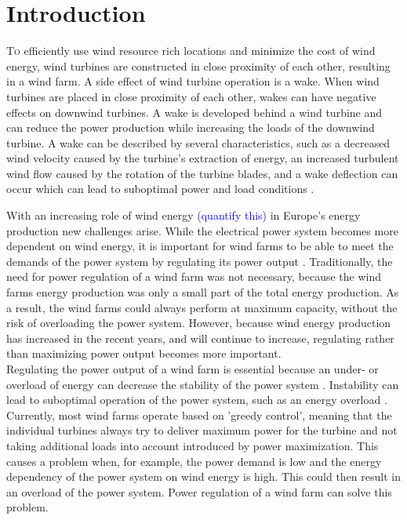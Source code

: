 \section{Introduction}
\lettrine[nindent=0em,lines=3]To efficiently use wind resource rich locations and minimize the cost of wind energy, wind turbines are constructed in close proximity of each other, resulting in a wind farm. A side effect of wind turbine operation is a wake. When wind turbines are placed in close proximity of each other, wakes can have negative effects on downwind turbines. A wake is developed behind a wind turbine and can reduce the power production while increasing the loads of the downwind turbine. A wake can be described by several characteristics, such as a decreased wind velocity caused by the turbine's extraction of energy, an increased turbulent wind flow caused by the rotation of the turbine blades, and a wake deflection can occur which can lead to suboptimal power and load conditions \cite{Boersma2017, Wilson2017, Dijk2016, Fleming2014, Zalkind2016}.

With an increasing role of wind energy \textcolor{blue}{(quantify this)} in Europe's energy production new challenges arise\cite{Nat2016}. While the electrical power system becomes more dependent on wind energy, it is important for wind farms to be able to meet the demands of the power system by regulating its power output \cite{Tande2003}. Traditionally, the need for power regulation of a wind farm was not necessary, because the wind farms energy production was only a small part of the total energy production. As a result, the wind farms could always perform at maximum capacity, without the risk of overloading the power system. However, because wind energy production has increased in the recent years, and will continue to increase, regulating rather than maximizing power output becomes more important.\\ 
\indent Regulating the power output of a wind farm is essential because an under- or overload of energy can decrease the stability of the power system \cite{Tande2003}. Instability can lead to suboptimal operation of the power system, such as an energy overload \cite{Tande2003, Hansen20}. Currently, most wind farms operate based on 'greedy control', meaning that the individual turbines always try to deliver maximum power for the turbine and not taking additional loads into account introduced by power maximization. This causes a problem when, for example, the power demand is low and the energy dependency of the power system on wind energy is high. This could then result in an overload of the power system. Power regulation of a wind farm can solve this problem.

